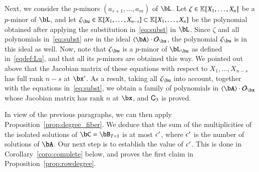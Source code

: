 \documentclass[amsthm]{elsart}
\begin{document}
Next, we consider the $p$-minors $(a_{s+1},\dots,a_m)$ of $\bL$. Let $\zeta
\in\mathbb{K}[X_1,\dots,X_n]$ be a $p$-minor of $\bL$, and let $\zeta_\bu \in
\KK[X_1,\dots,X_{n-s}]\subset \KK[X_1,\dots,X_{n}]$ be the polynomial obtained after applying the
substitution in~\eqref{eq:subst} in $\bL$.  Since
$\zeta$ and all polynomials in~\eqref{eq:subst} are in the ideal $\langle \bA
\rangle \cdot \mathcal{O}_\bx$, the polynomial $\zeta_\bu$ is in this ideal as
well. Now, note that $\zeta_\bu$ is a $p$-minor of $\bL_\bu$ as defined
in~\eqref{eqdef:Lu}, and that all its $p$-minors are obtained this way. We
pointed out above that the Jacobian matrix of these equations with respect to
$X_1,\dots,X_{n-s}$ has full rank $n-s$ at $\bx'$. As a result, taking all
$\zeta_\bu$ into account, together with the equations in~\eqref{eq:subst}, we
obtain a family of polynomials in $\langle \bA \rangle \cdot \mathcal{O}_\bx$
whose Jacobian matrix has rank $n$ at $\bx$, and $\mathsf{C}_3$ is proved.

\medskip

In view of the previous paragraphs, we can then apply
Proposition~\ref{prop:degree_fiber}. We deduce that the sum of the
multiplicities of the isolated solutions of $\bC=\bB_{T=1}$ is at most
${c'}{}$, where ${c'}{}$ is the number of solutions of $\bA$. Our next step
is to establish the value of ${c'}{}$. This is done in
Corollary~\ref{coro:complete} below, and proves the first claim in
Proposition~\ref{prop:rowdegree}.
\end{document}
